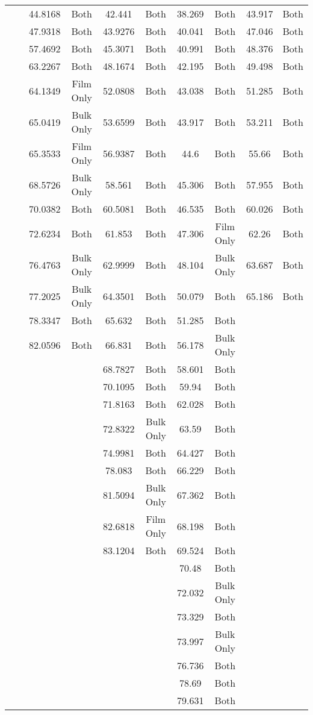 \documentclass[a4paper,12pt,oneside]{article}%
\begin{document}
\begin{table}[b]
\begin{tabular}{cccccccccc}
		&  & 44.8168 & Both & 42.441 & Both & 38.269 & Both & 43.917 & Both \\
		&  & 47.9318 & Both & 43.9276 & Both & 40.041 & Both & 47.046 & Both \\
		&  & 57.4692 & Both & 45.3071 & Both & 40.991 & Both & 48.376 & Both \\
		&  & 63.2267 & Both & 48.1674 & Both & 42.195 & Both & 49.498 & Both \\
		&  & 64.1349 & Film Only & 52.0808 & Both & 43.038 & Both & 51.285 & Both \\
		&  & 65.0419 & Bulk Only & 53.6599 & Both & 43.917 & Both & 53.211 & Both \\
		&  & 65.3533 & Film Only & 56.9387 & Both & 44.6 & Both & 55.66 & Both \\
		&  & 68.5726 & Bulk Only & 58.561 & Both & 45.306 & Both & 57.955 & Both \\
		&  & 70.0382 & Both & 60.5081 & Both & 46.535 & Both & 60.026 & Both \\
		&  & 72.6234 & Both & 61.853 & Both & 47.306 & Film Only & 62.26 & Both \\
		&  & 76.4763 & Bulk Only & 62.9999 & Both & 48.104 & Bulk Only & 63.687 & Both \\
		&  & 77.2025 & Bulk Only & 64.3501 & Both & 50.079 & Both & 65.186 & Both \\
		&  & 78.3347 & Both & 65.632 & Both & 51.285 & Both &  &  \\
		&  & 82.0596 & Both & 66.831 & Both & 56.178 & Bulk Only &  &  \\
		&  &  &  & 68.7827 & Both & 58.601 & Both &  &  \\
		&  &  &  & 70.1095 & Both & 59.94 & Both &  &  \\
		&  &  &  & 71.8163 & Both & 62.028 & Both &  &  \\
		&  &  &  & 72.8322 & Bulk Only & 63.59 & Both &  &  \\
		&  &  &  & 74.9981 & Both & 64.427 & Both &  &  \\
		&  &  &  & 78.083 & Both & 66.229 & Both &  &  \\
		&  &  &  & 81.5094 & Bulk Only & 67.362 & Both &  &  \\
		&  &  &  & 82.6818 & Film Only & 68.198 & Both &  &  \\
		&  &  &  & 83.1204 & Both & 69.524 & Both &  &  \\
		&  &  &  &  &  & 70.48 & Both &  &  \\
		&  &  &  &  &  & 72.032 & Bulk Only &  &  \\
		&  &  &  &  &  & 73.329 & Both &  &  \\
		&  &  &  &  &  & 73.997 & Bulk Only &  &  \\
		&  &  &  &  &  & 76.736 & Both &  &  \\
		&  &  &  &  &  & 78.69 & Both &  &  \\
		&  &  &  &  &  & 79.631 & Both &  & \\
	\end{tabular}
	\label{tab:Sub_Annealing_XRD_Peaks}
\end{table}
\end{document}
